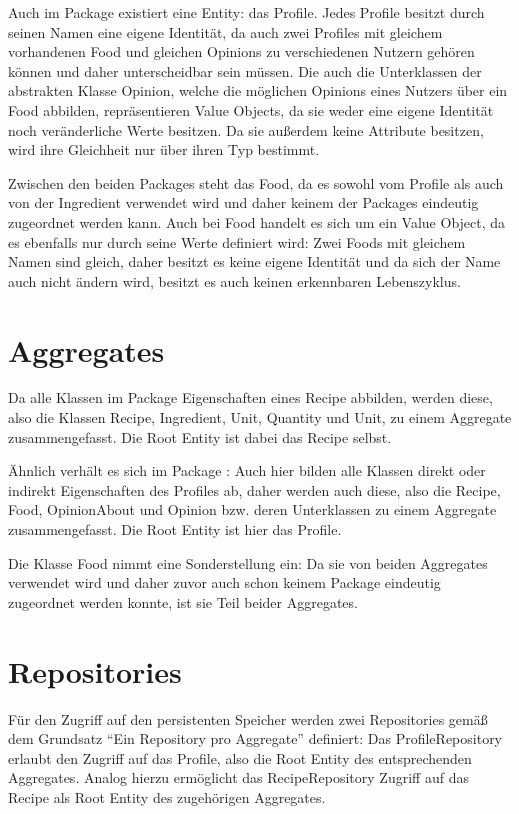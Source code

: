 Auch im Package  existiert eine Entity: das Profile. Jedes Profile besitzt durch seinen Namen eine eigene Identität, da auch zwei Profiles mit gleichem vorhandenen Food und gleichen Opinions zu verschiedenen Nutzern gehören können und daher unterscheidbar sein müssen. Die auch die Unterklassen der abstrakten Klasse Opinion, welche die möglichen Opinions eines Nutzers über ein Food abbilden, repräsentieren Value Objects, da sie weder eine eigene Identität noch veränderliche Werte besitzen. Da sie außerdem keine Attribute besitzen, wird ihre Gleichheit nur über ihren Typ bestimmt.

Zwischen den beiden Packages steht das Food, da es sowohl vom Profile als auch von der Ingredient verwendet wird und daher keinem der Packages eindeutig zugeordnet werden kann. Auch bei Food handelt es sich um ein Value Object, da es ebenfalls nur durch seine Werte definiert wird: Zwei Foods mit gleichem Namen sind gleich, daher besitzt es keine eigene Identität und da sich der Name auch nicht ändern wird, besitzt es auch keinen erkennbaren Lebenszyklus. 

\section{Aggregates}
Da alle Klassen im Package  Eigenschaften eines Recipe abbilden, werden diese, also die Klassen Recipe, Ingredient, Unit, Quantity und Unit, zu einem Aggregate zusammengefasst. Die Root Entity ist dabei das Recipe selbst.

Ähnlich verhält es sich im Package : Auch hier bilden alle Klassen direkt oder indirekt Eigenschaften des Profiles ab, daher werden auch diese, also die Recipe, Food, OpinionAbout und Opinion bzw. deren Unterklassen zu einem Aggregate zusammengefasst. Die Root Entity ist hier das Profile.

Die Klasse Food nimmt eine Sonderstellung ein: Da sie von beiden Aggregates verwendet wird und daher zuvor auch schon keinem Package eindeutig zugeordnet werden konnte, ist sie Teil beider Aggregates.

\section{Repositories}
Für den Zugriff auf den persistenten Speicher werden zwei Repositories gemäß dem Grundsatz \enquote{Ein Repository pro Aggregate} definiert: Das ProfileRepository erlaubt den Zugriff auf das Profile, also die Root Entity des entsprechenden Aggregates. Analog hierzu ermöglicht das RecipeRepository Zugriff auf das Recipe als Root Entity des zugehörigen Aggregates. 
